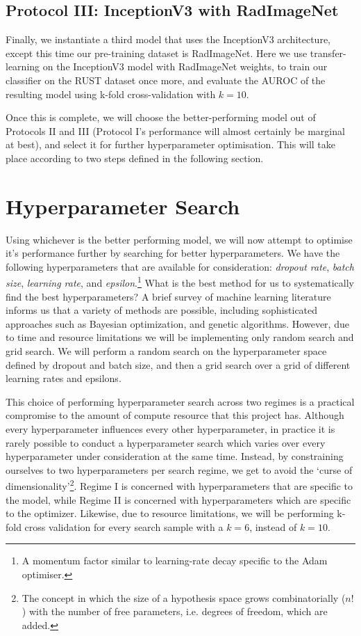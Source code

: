 \subsection{Protocol III: InceptionV3 with RadImageNet}\label{sec:protocol-iii-method}

Finally, we instantiate a third model that uses the InceptionV3 architecture, except this time our pre-training dataset is RadImageNet. Here we use transfer-learning on the InceptionV3 model with RadImageNet weights, to train our classifier on the RUST dataset once more, and evaluate the AUROC of the resulting model using k-fold cross-validation with \(k=10\).

Once this is complete, we will choose the better-performing model out of Protocols II and III (Protocol I's performance will almost certainly be marginal at best), and select it for further hyperparameter optimisation. This will take place according to two steps defined in the following section.

\section{Hyperparameter Search}\label{sec:hypersearch}

Using whichever is the better performing model, we will now attempt to optimise it's performance further by searching for better hyperparameters. We have the following hyperparameters that are available for consideration: \emph{dropout rate}, \emph{batch size}, \emph{learning rate}, and \emph{epsilon}.\footnote{A momentum factor similar to learning-rate decay specific to the Adam optimiser.} What is the best method for us to systematically find the best hyperparameters? A brief survey of machine learning literature informs us that a variety of methods are possible, including sophisticated approaches such as Bayesian optimization, and genetic algorithms. \autocite{yang2020} However, due to time and resource limitations we will be implementing only random search and grid search. We will perform a random search on the hyperparameter space defined by dropout and batch size, and then a grid search over a grid of different learning rates and epsilons.

This choice of performing hyperparameter search across two regimes is a practical compromise to the amount of compute resource that this project has. Although every hyperparameter influences every other hyperparameter, in practice it is rarely possible to conduct a hyperparameter search which varies over every hyperparameter under consideration at the same time. Instead, by constraining ourselves to two hyperparameters per search regime, we get to avoid the \enquote*{curse of dimensionality}\footnote{The concept in which the size of a hypothesis space grows combinatorially (\(n!\)) with the number of free parameters, i.e. degrees of freedom, which are added.}. Regime I is concerned with hyperparameters that are specific to the model, while Regime II is concerned with hyperparameters which are specific to the optimizer. Likewise, due to resource limitations, we will be performing k-fold cross validation for every search sample with a \(k=6\), instead of \(k=10\).

